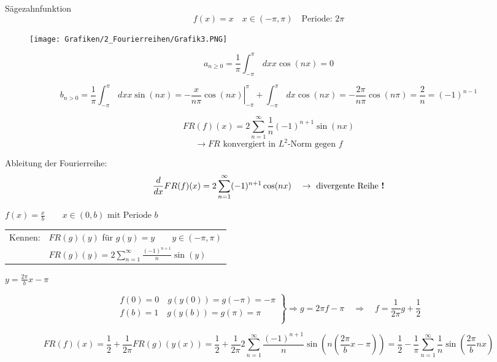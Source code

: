 \begin{Bsp}{Sägezahnfunktion}
	$$f(x)=x \quad x \in (-\pi,\pi) \quad \textrm{Periode: } 2\pi$$
	\begin{figure}[H]
		\centering
		\texttt{[image: Grafiken/2\_Fourierreihen/Grafik3.PNG]}
	\end{figure}

	$$a_{n \geq 0} = \frac{1}{\pi} \int_{-\pi}^{\pi} \,dx x \cos(nx) = 0$$
	
	$$
	b_{n > 0} = \frac{1}{\pi} \int_{-\pi}^{\pi} \,dx x \sin(nx)
		= \left. - \frac{x}{n \pi} \cos(nx) \right\vert_{-\pi}^\pi
			+ \int_{-\pi}^{\pi} \,dx \cos(nx)
		= - \frac{2 \pi}{n \pi} \cos(n\pi)
		= \frac{2}{n} = (-1)^{n-1}
	$$

	$$FR(f)(x) = 2 \sum_{n=1}^\infty \frac{1}{n} (-1)^{n+1} \sin(nx)$$
	$$\rightarrow FR \textrm{ konvergiert in } L^2\textrm{-Norm gegen } f$$

	Ableitung der Fourierreihe:
	$$\frac{d}{dx} FR(f)(x) = 2 \sum_{n=1}^\infty (-1)^{n+1} \cos(nx) \quad \rightarrow
	\textrm{ divergente Reihe \textbf{!}}$$
\end{Bsp}

\begin{Bsp}{$f(x)=\frac{x}{b} \qquad x \in (0,b) \textrm{ mit Periode } b$}
	
	\begin{tabular}{ll}
		Kennen:	& $FR(g)(y)$ für $g(y)=y \qquad y \in (- \pi , \pi)$ \\
				& $FR(g)(y) = 2 \sum_{n=1}^\infty \frac{(-1)^{n+1}}{n} \sin(y)$
	\end{tabular}

	$y = \frac{2 \pi}{b} x - \pi$

	$$
	\left.
	\begin{array}{l}
		f(0) = 0 \quad g(y(0)) = g(-\pi) = -\pi \\
		f(b) = 1 \quad g(y(b)) = g(\pi) = \pi \\
	\end{array}
	\right\}
	\Rightarrow g = 2\pi f - \pi \quad \Rightarrow \quad f = \frac{1}{2\pi}g + 
	\frac{1}{2}
	$$

	$$
	FR(f)(x) = \frac{1}{2} + \frac{1}{2\pi} FR(g)(y(x))
		= \frac{1}{2} + \frac{1}{2\pi} 2 \sum_{n=1}^\infty \frac{(-1)^{n+1}}{n}
			\sin\left( n \left( \frac{2\pi}{b}x-\pi \right) \right)
		= \frac{1}{2} - \frac{1}{\pi} \sum_{n=1}^\infty \frac{1}{n}
			\sin \left( \frac{2\pi}{b} n x \right)
	$$

\end{Bsp}

